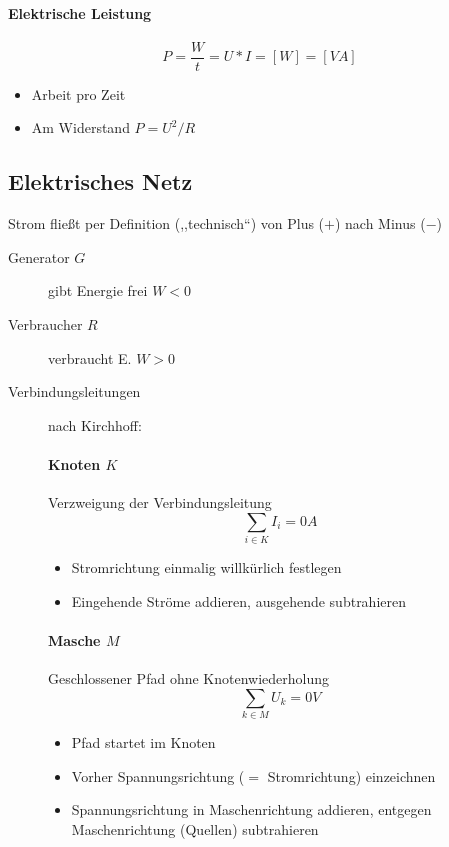 \paragraph{Elektrische Leistung}

$$P = \frac{W}{t} = U * I = [W] = [VA]$$

\begin{itemize}
  \item Arbeit pro Zeit
  \item Am Widerstand $P = U^2 / R$
\end{itemize}

\subsection{Elektrisches Netz}


Strom flie\ss t per Definition (,,technisch``) von Plus ($+$) nach Minus ($-$)

\begin{description}
  \item[Generator $G$] gibt Energie frei $W < 0$
  \item[Verbraucher $R$] verbraucht E. $W > 0$
  \item[Verbindungsleitungen] nach Kirchhoff:
    \paragraph{Knoten $K$} Verzweigung der Verbindungsleitung
    $$\sum_{i \in K} I_i = 0 A$$

    \begin{itemize}
      \item Stromrichtung einmalig willkürlich festlegen
      \item Eingehende Ströme addieren, ausgehende subtrahieren
    \end{itemize}

    \paragraph{Masche $M$} Geschlossener Pfad ohne Knotenwiederholung
    $$\sum_{k \in M} U_k = 0 V$$

    \begin{itemize}
      \item Pfad startet im Knoten
      \item Vorher Spannungsrichtung ($=$ Stromrichtung) einzeichnen
      \item Spannungsrichtung in Maschenrichtung addieren, entgegen Maschenrichtung (Quellen) subtrahieren
    \end{itemize}
\end{description}

